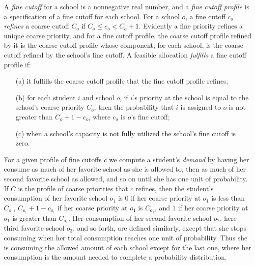 \documentclass[12pt]{article}
\theoremstyle{definition}
\begin{document}
A \emph{fine cutoff} for a school is a nonnegative real number, and a
\emph{fine cutoff profile} is a specification of a fine cutoff for
each school.  For a school $o$, a fine cutoff $c_o$ \emph{refines} a
coarse cutoff $C_o$ if $C_o \le c_o < C_o + 1$.  Evidently a fine
priority refines a unique coarse priority, and for a fine cutoff
profile, the coarse cutoff profile refined by it is the coarse cutoff
profile whose component, for each school, is the coarse cutoff refined
by the school's fine cutoff.  A feasible allocation \emph{fulfills} a
fine cutoff profile if:
\begin{enumerate}
  \item[(a)] it fulfills the coarse cutoff profile that the fine
    cutoff profile refines;
  \item[(b)] for each student $i$ and school $o$, if $i$'s priority at
    the school is equal to the school's coarse priority $C_o$, then
    the probability that $i$ is assigned to $o$ is not greater than
    $C_o + 1 - c_o$, where $c_o$ is $o$'s fine cutoff;
  \item[(c)] when a school's capacity is not fully utilized the
    school's fine cutoff is zero.
\end{enumerate}

For a given profile of fine cutoffs $c$ we compute a student's
\emph{demand} by having her consume as much of her favorite school as
she is allowed to, then as much of her second favorite school as
allowed, and so on until she has one unit of probability.  If $C$ is
the profile of coarse priorities that $c$ refines, then the student's
consumption of her favorite school $o_1$ is $0$ if her coarse priority
at $o_1$ is less than $C_{o_1}$, $C_{o_1} + 1 - c_{o_1}$ if her coarse
priority at $o_1$ is $C_{o_1}$, and $1$ if her coarse priority at
$o_1$ is greater than $C_{o_1}$.  Her consumption of her second
favorite school $o_2$, here third favorite school $o_3$, and so forth,
are defined similarly, except that she stops consuming when her total
consumption reaches one unit of probability.  Thus she is consuming
the allowed amount of each school except for the last one, where her
consumption is the amount needed to complete a probability
distribution.
\end{document}

